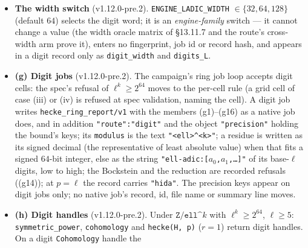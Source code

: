 \documentclass[11pt]{article}
\theoremstyle{remark}
\newcommand{\F}{\mathbb{F}}
\newcommand{\Z}{\mathbb{Z}}
\newcommand{\Fl}{\F_\ell}
\DeclareMathOperator{\rank}{rank}
\begin{document}
\begin{itemize}
  At $p=\ell$ the route computes, on the free block $U$ ($r\times r$) of $A^{(1)}(U_\ell)$ over
  $\Z/\ell^{k}$, $e=-p_0^{-1}W\,s(W)$ with $W=U^{rk}$ and $\chi_W(x)=x^{a}p(x)$, $p(x)=p_0+x\,s(x)$,
  $p_0$ a unit (Fitting: $W$ vanishes on the nilpotent summand and is invertible on the ordinary
  one, so $W p(W)=0$); $e$ is a polynomial in $U_\ell$, hence the ordinary projector
  $\lim U_\ell^{N!}$. It is certified by $e^2=e$, $eA(T_p)=A(T_p)e$ for the other primes of the
  cell, $(U(1-e))^{r}\equiv0\pmod\ell$, and $\rank_{\Fl}(e\bmod\ell)=\rank_{\Fl}(U\bmod\ell)^{r}$. The
  depth $m$ a Hida computation needs is supplied per question by [C]'s later Hida section; the
  route's bound $K=m+e_{\max}$ is its input, and no cap on $m$ beyond (a) and the per-cell rule is
  imposed.
\item \textbf{The width switch} (v1.12.0-pre.2). \texttt{ENGINE\_LADIC\_WIDTH} $\in\{32,64,128\}$
  (default $64$) selects the digit word; it is an \emph{engine-family} switch --- it cannot change a
  value (the width oracle matrix of \S13.11.7 and the route's cross-width arm prove it), enters no
  fingerprint, job id or record hash, and appears in a digit record only as \texttt{digit\_width}
  and \texttt{digits\_L}.
\item \textbf{(g) Digit jobs} (v1.12.0-pre.2). The campaign's ring job loop accepts digit cells: the
  spec's refusal of $\ell^k\ge2^{64}$ moves to the per-cell rule (a grid cell of case (iii) or (iv)
  is refused at spec validation, naming the cell). A digit job writes \texttt{hecke\_ring\_report/v1}
  with the members (g1)--(g16) as a native job does, and in addition \texttt{"route":"digit"} and the
  object \texttt{"precision"} holding the bound's keys; its \texttt{modulus} is the text
  \texttt{"<ell>\textasciicircum<k>"}; a residue is written as its signed decimal (the
  representative of least absolute value) when that fits a signed $64$-bit integer, else as the
  string \texttt{"ell-adic:[}$a_0$\texttt{,}$a_1$\texttt{,\ldots]"} of its base-$\ell$ digits, low
  to high; the Bockstein and the reduction are recorded refusals ((g14)); at $p=\ell$ the record
  carries \texttt{"hida"}. The precision keys appear on digit jobs only; no native job's record, id,
  file name or summary line moves.
\item \textbf{(h) Digit handles} (v1.12.0-pre.2). Under $\texttt{Z/ell\textasciicircum}k$ with
  $\ell^k\ge2^{64}$, $\ell\ge5$: \texttt{symmetric\_power}, \texttt{cohomology} and
  \texttt{hecke(H, p)} ($r=1$) return digit handles. On a digit \texttt{Cohomology} handle the

\end{itemize}
\end{document}
